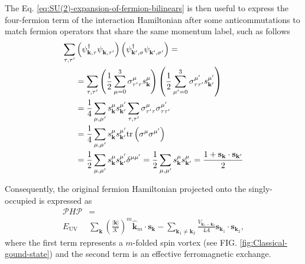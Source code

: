 \documentclass[english,aps,prd,nofootinbib,twocolumn]{revtex4-1}
\begin{document}
The Eq. \eqref{eq:SU(2)-expansion-of-fermion-bilinears}
is then useful to express the four-fermion term of the interaction Hamiltonian after some anticommutations to match fermion operators that share the same momentum label, such as follows
\begin{equation}
\begin{split}
\sum_{\tau ,\tau'}&
\left(\psi_{\mathbf{k ,\tau   }}^{\textcolor{black}{\dagger}}
\psi_{\mathbf{k ,\tau'  }}^{\textcolor{white}{\dagger}}\right)
\left(\psi_{\mathbf{k',\sigma }}^{\textcolor{black}{\dagger}}
\psi_{\mathbf{k',\sigma'}}^{\textcolor{white}{\dagger}}\right)
 = \\ &=
\sum_{\tau ,\tau'}
\left(
\frac{1}{2} 
\sum_{\mu =0}^{3} 
\sigma^{\mu }_{\tau'\tau }s^{\mu }_{\mathbf{k }}
\right)
\left(
\frac{1}{2} 
\sum_{\mu'=0}^{3} 
\sigma^{\mu'}_{\tau \tau'}s^{\mu'}_{\mathbf{k'}}
\right) \\ &=
\frac{1}{4}
\sum_{\mu ,\mu'}
s^{\mu }_{\mathbf{k }}
s^{\mu'}_{\mathbf{k'}}
\sum_{\tau ,\tau'}
\sigma^{\mu }_{\tau'\tau }
\sigma^{\mu'}_{\tau \tau'}
 \\ &=
\frac{1}{4}
\sum_{\mu ,\mu'}
s^{\mu }_{\mathbf{k }}
s^{\mu'}_{\mathbf{k'}}
\mathrm{tr}\left( \sigma^{\mu }\sigma^{\mu'} \right)
\\ &=
\frac{1}{2}
\sum_{\mu ,\mu'}
s^{\mu }_{\mathbf{k }}
s^{\mu'}_{\mathbf{k'}}
\delta^{\mu \mu'}
=
\frac{1}{2}
\sum_{\mu ,\mu'}
s^{\mu }_{\mathbf{k }}
s^{\mu }_{\mathbf{k'}}
=
\frac{
1 + 
\mathbf{s}_{\mathbf{k }}
\cdot
\mathbf{s}_{\mathbf{k'}}
}{2}
\end{split}
\end{equation}

Consequently, the original fermion Hamiltonian projected onto the singly-occupied is expressed as
\begin{equation}
\label{eq:Effective-Heisenberg-Hamiltonian}
\begin{split}
\mathcal{P} H \mathcal{P} &= \\
E_{\mathrm{UV} }&
\sum_{\mathbf{k }} \left(\frac{|\mathbf{k}|}{\mathcal{K}}\right)^{m}
\!\! 
\hat{\mathbf{k}}_{m}\!\! \cdot \mathbf{s}_{\mathbf{k }} - 
\sum_{\mathbf{k}_{1} \neq \mathbf{k}_{2}}
\frac{V_{\mathbf{k}_{1}-\mathbf{k}_{2}}}{4A}
\mathbf{s}_{\mathbf{k}_{1}}\!\!
\cdot
\mathbf{s}_{\mathbf{k}_{2}}
,
\end{split}
\end{equation}
where the first term represents a $m$-folded spin vortex (see FIG. \ref{fig:Classical-gound-state}) and the second term is an effective ferromagnetic exchange. 
\end{document}
